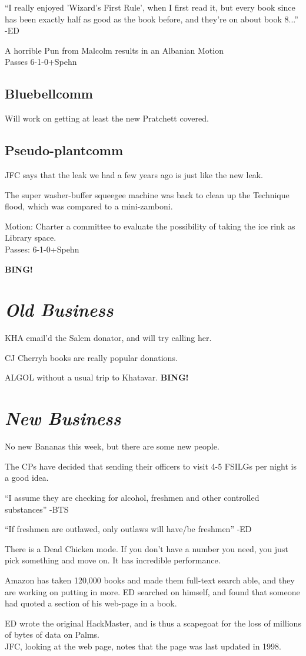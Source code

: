 \documentclass[10pt]{article}
\newcommand{\bing}{{\bf BING!} }
\newcommand{\goto}[1]{\bing \vskip 12pt \section*{{\em{#1}}}}
\begin{document}
``I really enjoyed 'Wizard's First Rule', when I first read it, but
every book since has been exactly half as good as the book before, and
they're on about book 8...'' -ED

A horrible Pun from Malcolm results in an Albanian Motion\\
Passes 6-1-0+Spehn

\subsection*{Bluebellcomm}
Will work on getting at least the new Pratchett covered.

\subsection*{Pseudo-plantcomm}
JFC says that the leak we had a few years ago is just like the new leak.

The super washer-buffer squeegee machine was back to clean up the
Technique flood, which was compared to a mini-zamboni.

Motion: Charter a committee to evaluate the possibility of taking the
ice rink as Library space.\\ 
Passes: 6-1-0+Spehn

\goto{Old Business}
KHA email'd the Salem donator, and will try calling her.

CJ Cherryh books are really popular donations.

ALGOL without a usual trip to Khatavar.
\goto{New Business}
No new Bananas this week, but there are some new people.

The CPs have decided that sending their officers to visit 4-5 FSILGs
per night is a good idea.

``I assume they are checking for alcohol, freshmen and other
controlled substances'' -BTS

``If freshmen are outlawed, only outlaws will have/be freshmen'' -ED

There is a Dead Chicken mode.  If you don't have a number you need,
you just pick something and move on. It has incredible performance.

Amazon has taken 120,000 books and made them full-text search able, and
they are working on putting in more.  ED searched on himself, and
found that someone had quoted a section of his web-page in a book.

ED wrote the original HackMaster, and is thus a scapegoat for the loss
of millions of bytes of data on Palms.\\
JFC, looking at the web page, notes that the page was last updated in
1998.
\end{document}
